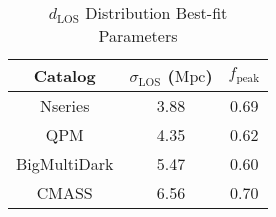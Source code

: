                                                                                                                                                                 \begin{table} 
                                                                                                                                                                  \caption{$d_{\mathrm{LOS}}$ Distribution Best-fit Parameters} \label{tab:mpfit}
                                                                                                                                                                    \begin{spacing}{1.5}
                                                                                                                                                                        \begin{center}
                                                                                                                                                                              \leavevmode
                                                                                                                                                                                    \begin{tabular}{ccc} \hline \hline
                                                                                                                                                                                          Catalog &$\sigma_\mathrm{LOS}$ ($\mathrm{Mpc}$) & $f_{\mathrm{peak}}$\\ \hline
                                                                                                                                                                                                Nseries&3.88&0.69\\
                                                                                                                                                                                                      QPM&4.35&0.62\\
                                                                                                                                                                                                            BigMultiDark&5.47&0.60\\ 
                                                                                                                                                                                                                  CMASS&6.56&0.70\\ \hline

\end{tabular}
\end{center}
\end{spacing}
\end{table}
